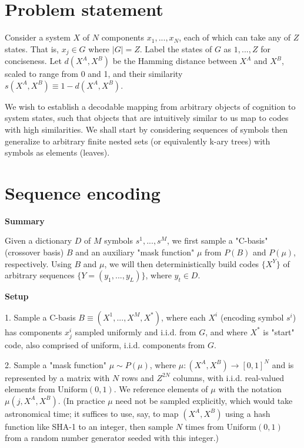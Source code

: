 \documentclass{article}
\begin{document}
\section{Problem statement}

Consider a system $X$ of $N$ components $x_1, ..., x_N$, each of which can take any of $Z$ states. That is, $x_j \in G$ where $|G| = Z$. Label the states of $G$ as $1,...,Z$ for conciseness. Let $d(X^A, X^B)$ be the Hamming distance between $X^A$ and $X^B$, scaled to range from 0 and 1, and their similarity $s(X^A, X^B) \equiv 1 - d(X^A, X^B)$.

We wish to establish a decodable mapping from arbitrary objects of cognition to system states, such that objects that are intuitively similar to us map to codes with high similarities. We shall start by considering sequences of symbols then generalize to arbitrary finite nested sets (or equivalently k-ary trees) with symbols as elements (leaves).

\section{Sequence encoding}

\textbf{Summary}

Given a dictionary $D$ of $M$ symbols $s^1, ..., s^M$, we first sample a "C-basis" (crossover basis) $B$ and an auxiliary "mask function" $\mu$ from $P(B)$ and $P(\mu)$, respectively. Using $B$ and $\mu$, we will then deterministically build codes $\{X^Y\}$ of arbitrary sequences $\{Y = (y_1, ..., y_L)\}$, where $y_t \in D$.

\textbf{Setup}

1. Sample a C-basis $B \equiv (X^1, ..., X^M, X^*)$, where each $X^i$ (encoding symbol $s^i$) has components $x^i_j$ sampled uniformly and i.i.d. from $G$, and where $X^*$ is "start" code, also comprised of uniform, i.i.d. components from $G$.

2. Sample a "mask function" $\mu \sim P(\mu)$, where $\mu:(X^A, X^B) \rightarrow [0, 1]^N$ and is represented by a matrix with $N$ rows and $Z^{2N}$ columns, with i.i.d. real-valued elements from $\textrm{Uniform}(0, 1)$. We reference elements of $\mu$ with the notation $\mu(j, X^A, X^B)$. (In practice $\mu$ need not be sampled explicitly, which would take astronomical time; it suffices to use, say, to map $(X^A, X^B)$ using a hash function like SHA-1 to an integer, then sample $N$ times from $\textrm{Uniform}(0, 1)$ from a random number generator seeded with this integer.)
\end{document}
